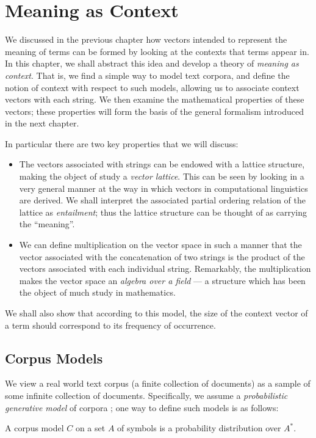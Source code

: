 \documentclass[11pt]{report}
\begin{document}
\chapter{Meaning as Context}

We discussed in the previous chapter how vectors intended to represent the meaning of terms can be formed by looking at the contexts that terms appear in. In this chapter, we shall abstract this idea and develop a theory of \emph{meaning as context}. That is, we find a simple way to model text corpora, and define the notion of context with respect to such models, allowing us to associate context vectors with each string. We then examine the mathematical properties of these vectors; these properties will form the basis of the general formalism introduced in the next chapter.

In particular there are two key properties that we will discuss:
\begin{itemize}
\item The vectors associated with strings can be endowed with a lattice structure, making the object of study a \emph{vector lattice}. This can be seen by looking in a very general manner at the way in which vectors in computational linguistics are derived. We shall interpret the associated partial ordering relation of the lattice as \emph{entailment}; thus the lattice structure can be thought of as carrying the ``meaning''.
\item We can define multiplication on the vector space in such a manner that the vector associated with the concatenation of two strings is the product of the vectors associated with each individual string. Remarkably, the multiplication makes the vector space an \emph{algebra over a field} --- a structure which has been the object of much study in mathematics.
\end{itemize}
We shall also show that according to this model, the size of the context vector of a term should correspond to its frequency of occurrence.

\section{Corpus Models}

 We view a real world text corpus (a finite collection of documents) as a sample of some infinite collection of documents. Specifically, we assume a \emph{probabilistic generative model} of corpora \citep{Blei:03}; one way to define such models is as follows:
\begin{defn}[Corpus Model]
A corpus model $C$ on a set $A$ of symbols is a probability distribution over $A^*$.
\end{defn}\noindent
\end{document}

